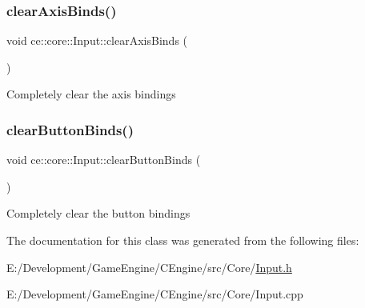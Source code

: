 \subsubsection{\texorpdfstring{clear\+Axis\+Binds()}{clearAxisBinds()}}
{\footnotesize\ttfamily void ce\+::core\+::\+Input\+::clear\+Axis\+Binds (\begin{DoxyParamCaption}{ }\end{DoxyParamCaption})}

Completely clear the axis bindings \mbox{\label{classce_1_1core_1_1_input_a84f905f6bd9f450d26fd23e1f8868dcb}} 
\subsubsection{\texorpdfstring{clear\+Button\+Binds()}{clearButtonBinds()}}
{\footnotesize\ttfamily void ce\+::core\+::\+Input\+::clear\+Button\+Binds (\begin{DoxyParamCaption}{ }\end{DoxyParamCaption})}

Completely clear the button bindings 

The documentation for this class was generated from the following files\+:\begin{DoxyCompactItemize}
\item 
E\+:/\+Development/\+Game\+Engine/\+C\+Engine/src/\+Core/\hyperlink{_input_8h}{Input.\+h}\item 
E\+:/\+Development/\+Game\+Engine/\+C\+Engine/src/\+Core/Input.\+cpp\end{DoxyCompactItemize}
